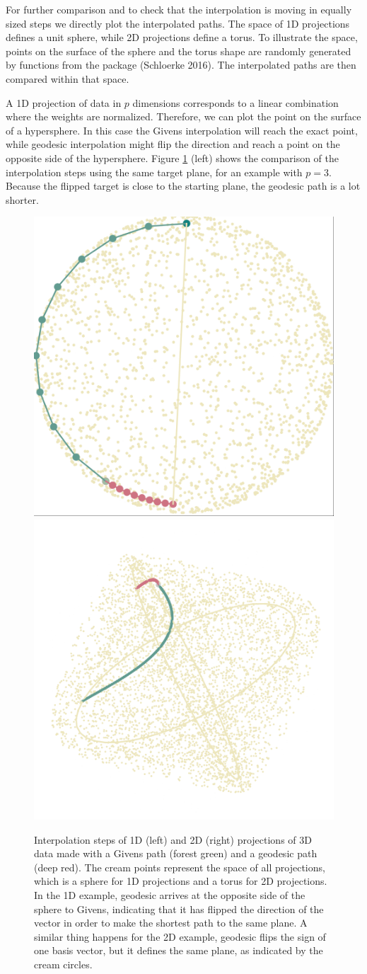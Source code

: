 \documentclass{article}
\begin{document}
For further comparison and to check that the interpolation is moving in
equally sized steps we directly plot the interpolated paths. The space
of 1D projections defines a unit sphere, while 2D projections define a
torus. To illustrate the space, points on the surface of the sphere and
the torus shape are randomly generated by functions from the
 package (Schloerke 2016). The interpolated paths are
then compared within that space.

A 1D projection of data in \(p\) dimensions corresponds to a linear
combination where the weights are normalized. Therefore, we can plot the
point on the surface of a hypersphere. In this case the Givens
interpolation will reach the exact point, while geodesic interpolation
might flip the direction and reach a point on the opposite side of the
hypersphere. Figure \ref{fig:1d-path-static} (left) shows the comparison
of the interpolation steps using the same target plane, for an example
with \(p=3\). Because the flipped target is close to the starting plane,
the geodesic path is a lot shorter.

\begin{figure}

{\centering \includegraphics[width=0.45\linewidth]{figures/sphere_static} \includegraphics[width=0.45\linewidth]{figures/torus_static} 

}

\caption{Interpolation steps of 1D (left) and 2D (right) projections of 3D data made with a Givens path (forest green) and a geodesic path (deep red). The cream points represent the space of all projections, which is a sphere for 1D projections and a torus for 2D projections. In the 1D example, geodesic arrives at the opposite side of the sphere to Givens, indicating that it has flipped the direction of the vector in order to make the shortest path to the same plane. A similar thing happens for the 2D example, geodesic flips the sign of one basis vector, but it defines the same plane, as indicated by the cream circles.}\label{fig:1d-path-static}
\end{figure}
\end{document}

